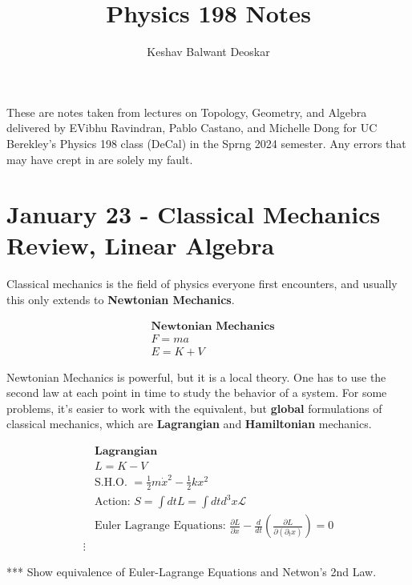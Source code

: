 \documentclass{article}
\title{Physics 198 Notes}
\author{Keshav Balwant Deoskar}
\begin{document}
\maketitle

These are notes taken from lectures on Topology, Geometry, and Algebra delivered by EVibhu Ravindran, Pablo Castano, and Michelle Dong for UC Berekley's Physics 198 class (DeCal) in the Sprng 2024 semester. Any errors that may have crept in are solely my fault.

\tableofcontents

\pagebreak

\section{January 23 - Classical Mechanics Review, Linear Algebra}
Classical mechanics is the field of physics everyone first encounters, and usually this only extends to \textbf{Newtonian Mechanics}.

\begin{align*}
  &\textbf{Newtonian Mechanics} \\
  & F = ma \\
  & E = K + V
\end{align*}

\vskip 1cm
Newtonian Mechanics is powerful, but it is a local theory. One has to use the second law at each point in time to study the behavior of a system. For some problems, it's easier to work with the equivalent, but \textbf{global} formulations of classical mechanics, which are \textbf{Lagrangian} and \textbf{Hamiltonian} mechanics.

\begin{align*}
  &\textbf{Lagrangian}\\
  &L = K - V \\
  &\text{S.H.O. } = \frac{1}{2}m\dot{x}^2 - \frac{1}{2}kx^2\\
  &\text{Action: } S = \int dt L = \int dt d^3x \mathcal{L}\\
  &\text{Euler Lagrange Equations: } \frac{\partial L}{\partial x} - \frac{d}{dt} \left( \frac{\partial L}{\partial (\partial_t x)} \right) = 0 \\
  \vdots
\end{align*}

*** Show equivalence of Euler-Lagrange Equations and Netwon's 2nd Law.
\end{document}
